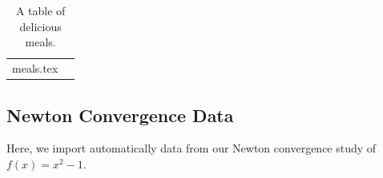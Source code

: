 \documentclass[12pt]{article}
\makeatletter
\def\expinput#1{\@@input#1 }
\makeatother
\begin{document}
\begin{table}[h]
\begin{centering}
  \begin{tabular}{      l             |        c             }
   \toprule  %
   \expinput{meals.tex}  
   \bottomrule  %
  \end{tabular}
  \caption{A table of delicious meals. \label{tab:1}}
  \end{centering}
\end{table}

\subsection{Newton Convergence Data}
Here, we import automatically data from our Newton convergence study of $f(x) = x^2 - 1$.


%
%
\end{document}
